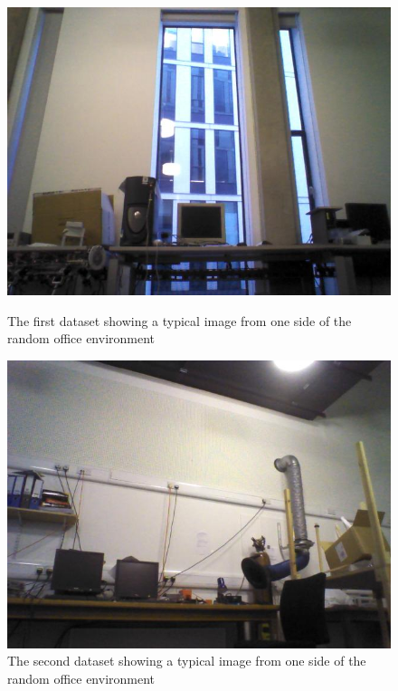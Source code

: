 \documentclass{article}
\begin{document}
\begin{figure}[h!]
\begin{minipage}[b]{0.5\linewidth}
\includegraphics[scale=0.5]{../Drawings/datasetImages/dataset5.jpg}
\caption{The first dataset showing a typical image from one side of the random office environment}
\label{fig:dataset5}
\end{minipage}
\hspace{0.5cm}
\begin{minipage}[b]{0.5\linewidth}
\includegraphics[scale=0.5]{../Drawings/datasetImages/dataset6.jpg}
\caption{The second dataset showing a typical image from one side of the random office environment}
\label{fig:dataset6}
\end{minipage}
\end{figure}
\end{document}
